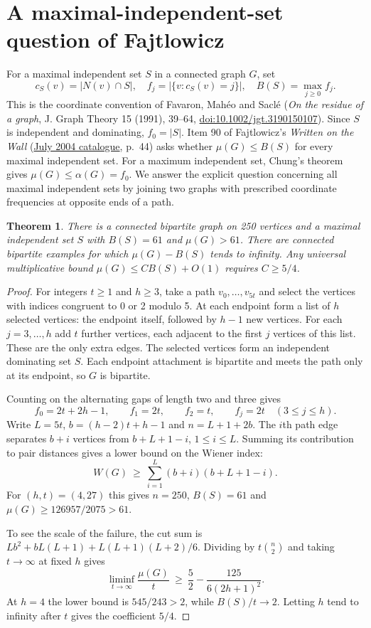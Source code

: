 \documentclass[11pt,a4paper]{article}
\newtheorem{theorem}{Theorem}[section]
\theoremstyle{remark}\newtheorem*{remark}{Remark}
\begin{document}
\section{A maximal-independent-set question of Fajtlowicz}
\label{sec:wow-ninety}
For a maximal independent set $S$ in a connected graph $G$, set
\[
 c_S(v)=|N(v)\cap S|,\quad f_j=|\{v:c_S(v)=j\}|,\quad
 B(S)=\max_{j\ge0} f_j .
\]
This is the coordinate convention of Favaron, Mah\'eo and Sacl\'e
(\emph{On the residue of a graph}, J. Graph Theory 15 (1991), 39--64,
\href{https://doi.org/10.1002/jgt.3190150107}{doi:10.1002/jgt.3190150107}).
Since $S$ is independent and dominating, $f_0=|S|$.
Item 90 of Fajtlowicz's \emph{Written on the Wall}
(\href{https://independencenumber.wordpress.com/wp-content/uploads/2012/08/wow-july2004.pdf}{July 2004 catalogue}, p.~44)
asks whether $\mu(G)\le B(S)$ for every maximal independent set.
For a maximum independent set, Chung's theorem gives
$\mu(G)\le\alpha(G)=f_0$. We answer the explicit question concerning
all maximal independent sets by joining two graphs with prescribed
coordinate frequencies at opposite ends of a path.

\begin{theorem}\label{thm:ninety}
There is a connected bipartite graph on 250 vertices and a maximal
independent set $S$ with $B(S)=61$ and $\mu(G)>61$.
There are connected bipartite examples for which $\mu(G)-B(S)$ tends
to infinity. Any universal multiplicative bound $\mu(G)\le C B(S)+O(1)$
requires $C\ge5/4$.
\end{theorem}
\begin{proof}
For integers $t\ge1$ and $h\ge3$, take a path
$v_0,\ldots,v_{5t}$ and select the vertices with indices congruent
to 0 or 2 modulo 5. At each endpoint form a list of $h$ selected vertices:
the endpoint itself, followed by $h-1$ new vertices. For each
$j=3,\ldots,h$ add $t$ further vertices, each adjacent to the first $j$
vertices of this list. These are the only extra edges.
The selected vertices form an independent dominating set $S$. Each
endpoint attachment is bipartite and meets the path only at its endpoint,
so $G$ is bipartite.

Counting on the alternating gaps of length two and three gives
\[
 f_0=2t+2h-1,\qquad f_1=2t,\qquad f_2=t,\qquad
 f_j=2t\quad(3\le j\le h).
\]
Write $L=5t$, $b=(h-2)t+h-1$ and $n=L+1+2b$. The $i$th path edge
separates $b+i$ vertices from $b+L+1-i$, $1\le i\le L$. Summing its
contribution to pair distances gives a lower bound on the Wiener index:
\[
 W(G)\ \ge\ \sum_{i=1}^{L}(b+i)(b+L+1-i).
\]
For $(h,t)=(4,27)$ this gives $n=250$, $B(S)=61$ and
$\mu(G)\ge126957/2075>61$.

To see the scale of the failure, the cut sum is
$Lb^2+bL(L+1)+L(L+1)(L+2)/6$. Dividing by
$t\binom n2$ and taking $t\to\infty$ at fixed $h$ gives
\[
 \liminf_{t\to\infty}\frac{\mu(G)}t
 \ \ge\ \frac52-\frac{125}{6(2h+1)^2}.
\]
At $h=4$ the lower bound is $545/243>2$, while $B(S)/t\to2$.
Letting $h$ tend to infinity after $t$ gives the coefficient $5/4$.
\end{proof}
\end{document}
